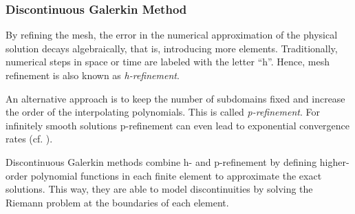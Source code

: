 \subsubsection{Discontinuous Galerkin Method}
\label{sec:polyonome-ansatz}

By refining the mesh, the error in the numerical approximation of the physical
solution decays algebraically, that is, introducing more elements.
Traditionally, numerical steps in space or time are labeled with the letter
``h''. Hence, mesh refinement is also known as \emph{h-refinement}.




An alternative approach is to keep the number of subdomains fixed and increase
the order of the interpolating polynomials. This is called \emph{p-refinement}.
For infinitely smooth solutions p-refinement can even lead to exponential
convergence rates (cf. \cite{tugnoli2016locally}).

Discontinuous Galerkin methods combine h- and p-refinement by defining
higher-order polynomial functions in each finite element to approximate the
exact solutions. This way, they are able to model discontinuities by solving
the Riemann problem at the boundaries of each element.


